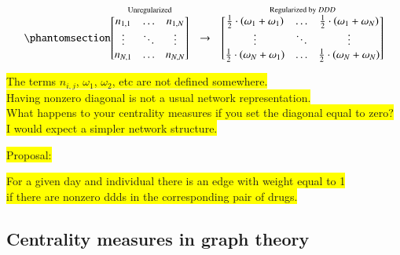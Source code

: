 \documentclass[
  authoryear,
  review]{elsarticle}
\begin{document}
\begin{equation}\phantomsection\label{eq-regularize-mtx}{
\stackrel{\textrm{Unregularized}}{
  \begin{bmatrix}
  n_{1, 1} & \dots & n_{1, N} \\
  \vdots & \ddots & \vdots \\
  n_{N, 1} & \dots & n_{N, N} \\
  \end{bmatrix}
}
\quad \to \quad
\stackrel{\textrm{Regularized by } DDD}{
  \begin{bmatrix}
  \frac{1}{2} \cdot \left(\omega_1 + \omega_1 \right) & \dots & \frac{1}{2} \cdot \left(\omega_1 + \omega_N \right) \\
  \vdots & \ddots & \vdots \\
  \frac{1}{2} \cdot \left(\omega_N + \omega_1 \right) & \dots & \frac{1}{2} \cdot \left(\omega_N + \omega_N \right) \\
  \end{bmatrix}
}
}\end{equation}

\colorbox{yellow}{The terms $n_{i,j}$, $\omega_1$, $\omega_2$, etc are not defined somewhere.}\\
\colorbox{yellow}{Having nonzero diagonal is not a usual network representation.}\\
\colorbox{yellow}{What happens to your centrality measures if you set the diagonal equal to zero?}\\
\colorbox{yellow}{I would expect a simpler network structure.}
\begin{center}
    \colorbox{yellow}{Proposal:}
\end{center}
\colorbox{yellow}{For a given day and individual there is an edge with weight equal to 1}\\
\colorbox{yellow}{if there are nonzero ddds in the corresponding pair of drugs.}\\



\subsection{Centrality measures in graph
theory}\label{centrality-measures-in-graph-theory}
\end{document}
